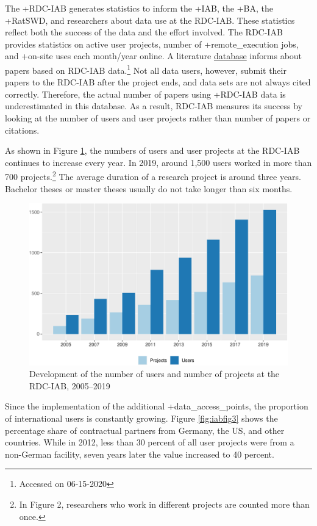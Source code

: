 \documentclass[
]{book}
\begin{document}
The +RDC-IAB\textbar{} generates statistics to inform the +IAB\textbar, the +BA\textbar, the +RatSWD\textbar, and researchers about data use at the RDC-IAB. These statistics reflect both the success of the data and the effort involved. The RDC-IAB provides statistics on active user projects, number of +remote\_execution\textbar{} jobs, and +on-site\textbar{} uses each month/year online. A literature \href{https://fdz.iab.de/en/FDZ_Publications/FDZ_Literature_Database.aspx}{database} informs about papers based on RDC-IAB data.\footnote{Accessed on 06-15-2020} Not all data users, however, submit their papers to the RDC-IAB after the project ends, and data sets are not always cited correctly. Therefore, the actual number of papers using +RDC-IAB\textbar{} data is underestimated in this database. As a result, RDC-IAB measures its success by looking at the number of users and user projects rather than number of papers or citations.

As shown in Figure \ref{fig:iabfig2}, the numbers of users and user projects at the RDC-IAB continues to increase every year. In 2019, around 1,500 users worked in more than 700 projects.\footnote{In Figure 2, researchers who work in different projects are counted more than once.} The average duration of a research project is around three years. Bachelor theses or master theses usually do not take longer than six months.

\begin{figure}
\centering
\includegraphics{figures/iabfig2-1.pdf}
\caption{\label{fig:iabfig2}Development of the number of users and number of projects at the RDC-IAB, 2005--2019}
\end{figure}

Since the implementation of the additional +data\_access\_points\textbar, the proportion of international users is constantly growing. Figure \ref{fig:iabfig3} shows the percentage share of contractual partners from Germany, the US, and other countries. While in 2012, less than 30 percent of all user projects were from a non-German facility, seven years later the value increased to 40 percent.
\end{document}
